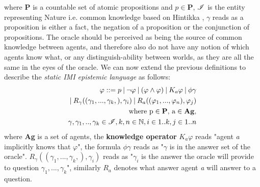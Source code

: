 where \textbf{P} is a countable set of atomic propositions and $p \in
	\mathbf{P}$, $\mathscr{I}$ is the entity representing Nature i.e. common knowledge
based on Hintikka \cite{hintikka88}, $\gamma$ reads as a proposition is either
a fact, the negation of a proposition or the conjunction of propositions. The oracle should be perceived as being the source of common knowledge between agents, and therefore also do not have any notion of which agents know what, or any distinguish-ability between worlds, as they are all the same in the eyes of the oracle.
We can now extend the previous definitions to describe the \textit{static IMI
	epistemic language} \staticlang\: as follows:
\begin{align}
	\begin{split}
		\varphi ::= p \:|\:\neg\varphi\:|\:(\varphi \land \varphi) \:|\: K_a\varphi \:|\: \phi\gamma \\ \:|\: R_\gamma((\gamma_1,...,\gamma_k,), \gamma_i) \:|\: R_a((\varphi_1,...,\varphi_n), \varphi_j) \\ \text{where p} \in \text{\textbf{P}}\text{, a} \in \text{\textbf{Ag}},\\ \gamma, \gamma_1,..,\gamma_k \in \mathscr{I}, k, n \in \mathbb{N}, i \in 1..k, j \in 1..n
	\end{split}
\end{align}
where \textbf{Ag} is a set of agents, the \textbf{knowledge operator} $K_a\varphi$ reads "agent \textit{a} implicitly knows that $\varphi$", the formula $\phi\gamma$ reads as "$\gamma$ is in the answer set of the oracle". $R_\gamma((\gamma_1,...,\gamma_k,), \gamma_i)$ reads as "$\gamma_i$ is the answer the oracle will provide to question $\gamma_1,...,\gamma_k$", similarly $R_a$ denotes what answer agent \textit{a} will answer to a question. \\

